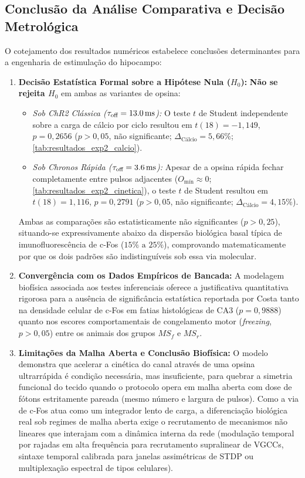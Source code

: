 \documentclass[12pt,openright,oneside,a4paper,brazil]{abntex2}
\begin{document}
\subsection{Conclusão da Análise Comparativa e Decisão Metrológica}
O cotejamento dos resultados numéricos estabelece conclusões determinantes para a engenharia de estimulação do hipocampo:
\begin{enumerate}
    \item \textbf{Decisão Estatística Formal sobre a Hipótese Nula ($H_0$):} \textbf{Não se rejeita $H_0$} em ambas as variantes de opsina:
          \begin{itemize}
              \item \emph{Sob ChR2 Clássica ($\tau_{\text{off}} = \qty{13{,}0}{\milli\second}$):} O teste $t$ de Student independente sobre a carga de cálcio por ciclo resultou em $t(18) = -1{,}149$, $p = 0{,}2656$ ($p > 0{,}05$, não significante; $\Delta_{\text{Cálcio}} = 5{,}66\%$; \cref{tab:resultados_exp2_calcio}).
              \item \emph{Sob Chronos Rápida ($\tau_{\text{off}} = \qty{3{,}6}{\milli\second}$):} Apesar de a opsina rápida fechar completamente entre pulsos adjacentes ($O_{\text{mín}} \approx 0$; \cref{tab:resultados_exp2_cinetica}), o teste $t$ de Student resultou em $t(18) = 1{,}116$, $p = 0{,}2791$ ($p > 0{,}05$, não significante; $\Delta_{\text{Cálcio}} = 4{,}15\%$).
          \end{itemize}
          Ambas as comparações são estatisticamente não significantes ($p > 0{,}25$), situando-se expressivamente abaixo da dispersão biológica basal típica de imunofluorescência de c-Fos ($15\%\text{ a }25\%$), comprovando matematicamente por que os dois padrões são indistinguíveis sob essa via molecular.
    \item \textbf{Convergência com os Dados Empíricos de Bancada:} A modelagem biofísica associada aos testes inferenciais oferece a justificativa quantitativa rigorosa para a ausência de significância estatística reportada por Costa \cite{costa2026} tanto na densidade celular de c-Fos em fatias histológicas de CA3 ($p = 0{,}9888$) quanto nos escores comportamentais de congelamento motor (\emph{freezing}, $p > 0{,}05$) entre os animais dos grupos $MS_f$ e $MS_r$.
    \item \textbf{Limitações da Malha Aberta e Conclusão Biofísica:} O modelo demonstra que acelerar a cinética do canal através de uma opsina ultrarrápida é condição necessária, mas insuficiente, para quebrar a simetria funcional do tecido quando o protocolo opera em malha aberta com dose de fótons estritamente pareada (mesmo número e largura de pulsos). Como a via de c-Fos atua como um integrador lento de carga, a diferenciação biológica real sob regimes de malha aberta exige o recrutamento de mecanismos não lineares que interajam com a dinâmica interna da rede (modulação temporal por rajadas em alta frequência para recrutamento supralinear de VGCCs, sintaxe temporal calibrada para janelas assimétricas de STDP ou multiplexação espectral de tipos celulares).
\end{enumerate}
\end{document}
